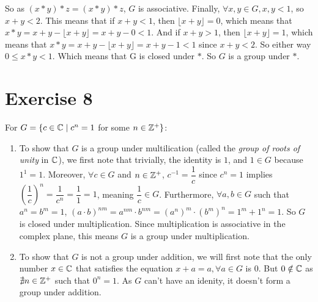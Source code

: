 \documentclass[12pt]{article}
\begin{document}
    So as $(x \ast y) \ast z = (x \ast y) \ast z$,
    $G$ is associative.
    Finally, $\forall x, y \in G, x, y < 1$,
    so $x + y < 2$.
    This means that if $x + y < 1$,
    then  $\lfloor x + y \rfloor = 0$,
    which means that $x \ast y = x + y - \lfloor x + y \rfloor = x + y - 0 < 1$.
    And if $x + y > 1$,
    then $\lfloor x + y \rfloor = 1$,
    which means that $x \ast y = x + y - \lfloor x + y \rfloor = x + y - 1 < 1$
    since $x + y < 2$.
    So either way $0 \leqslant x \ast y < 1$.
    Which means that G is closed under $\ast$.
    So $G$ is a group under $\ast$.

    
    \section*{Exercise 8}
    For $G = \{c \in \mathbb{C} \mid c^{n} = 1$ for some $n \in \mathbb{Z}^{+}\}$:
    \begin{enumerate}[label=\textbf{\alph*.}]
        \item 
            To show that $G$ is a group under multilication
            (called the \textit{group of roots of unity} in $\mathbb{C}$),
            we first note that trivially, the identity is $1$,
            and $1 \in G$ because $1^{1} = 1$.
            Moreover, $\forall c \in G$ and $n \in \mathbb{Z}^{+}$,
            $c^{-1} = \dfrac{1}{c}$
            since $c^{n} = 1$
            implies $(\dfrac{1}{c})^{n} = \dfrac{1}{c^{n}} = \dfrac{1}{1} = 1$,
            meaning $\dfrac{1}{c} \in G$.
            Furthermore, $\forall a, b \in G$
            such that $a^{n} = b^{m} = 1$,
            $(a \cdot b)^{nm}
            = a^{nm} \cdot b^{nm}
            = (a^{n})^{m} \cdot (b^{m})^{n}
            = 1^{m} + 1^{n}
            = 1$.
            So $G$ is closed under multiplication.
            Since multiplication is associative in the complex plane,
            this means $G$ is a group under multiplication.
        \item 
            To show that $G$ is not a group under addition,
            we will first note that the only number $x \in \mathbb{C}$
            that satisfies the equation $x + a = a, \forall a \in G$ is $0$.
            But $0 \notin \mathbb{C}$
            as $\nexists n \in \mathbb{Z}^{+}$
            such that $0^n = 1$.
            As $G$ can't have an idenity,
            it doesn't form a group under addition. 
    \end{enumerate}
\end{document}
